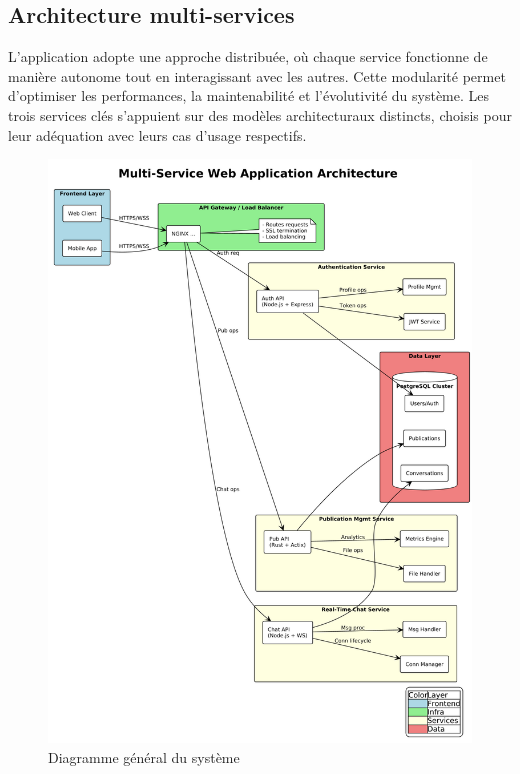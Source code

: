 \documentclass{rapportPfe}
\begin{document}
\subsection{Architecture multi-services}

L’application adopte une approche distribuée, où chaque service fonctionne de manière autonome tout en interagissant avec les autres. Cette modularité permet d’optimiser les performances, la maintenabilité et l’évolutivité du système. Les trois services clés s’appuient sur des modèles architecturaux distincts, choisis pour leur adéquation avec leurs cas d’usage respectifs.


\begin{figure}[htbp]
    \centering
    \includegraphics[width=1.0\textwidth]{diagrams/diagram.png}
    \caption{Diagramme général du système}
    \label{fig:diagram-general}
\end{figure}
\end{document}
